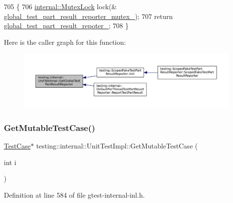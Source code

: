 \begin{DoxyCode}
705                                               \{
706   \hyperlink{namespacetesting_1_1internal_a08b187c6cc4e28400aadf9a32fccc8de}{internal::MutexLock} lock(&
      \hyperlink{classtesting_1_1internal_1_1UnitTestImpl_a57153c5c8caa229f0a62f35ab99f0a56}{global\_test\_part\_result\_reporter\_mutex\_});
707   \textcolor{keywordflow}{return} \hyperlink{classtesting_1_1internal_1_1UnitTestImpl_ab9a275094df6adc7e16a92133a692c3e}{global\_test\_part\_result\_repoter\_};
708 \}
\end{DoxyCode}
Here is the caller graph for this function\+:
\nopagebreak
\begin{figure}[H]
\begin{center}
\leavevmode
\includegraphics[width=350pt]{classtesting_1_1internal_1_1UnitTestImpl_a1cd291fd6751654924362164735d4b49_icgraph}
\end{center}
\end{figure}
\mbox{\label{classtesting_1_1internal_1_1UnitTestImpl_a2ca71a08060037357fc7e1a406b89add}} 
\subsubsection{\texorpdfstring{Get\+Mutable\+Test\+Case()}{GetMutableTestCase()}}
{\footnotesize\ttfamily \hyperlink{classtesting_1_1TestCase}{Test\+Case}$\ast$ testing\+::internal\+::\+Unit\+Test\+Impl\+::\+Get\+Mutable\+Test\+Case (\begin{DoxyParamCaption}\item[{int}]{i }\end{DoxyParamCaption})\hspace{0.3cm}{\ttfamily [inline]}}



Definition at line 584 of file gtest-\/internal-\/inl.\+h.



